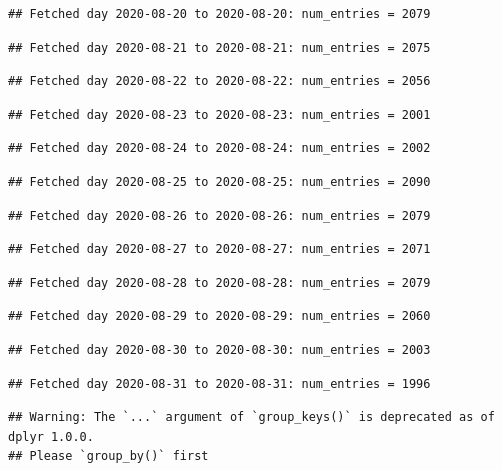 \documentclass[]{article}
\begin{document}
\begin{verbatim}
## Fetched day 2020-08-20 to 2020-08-20: num_entries = 2079
\end{verbatim}

\begin{verbatim}
## Fetched day 2020-08-21 to 2020-08-21: num_entries = 2075
\end{verbatim}

\begin{verbatim}
## Fetched day 2020-08-22 to 2020-08-22: num_entries = 2056
\end{verbatim}

\begin{verbatim}
## Fetched day 2020-08-23 to 2020-08-23: num_entries = 2001
\end{verbatim}

\begin{verbatim}
## Fetched day 2020-08-24 to 2020-08-24: num_entries = 2002
\end{verbatim}

\begin{verbatim}
## Fetched day 2020-08-25 to 2020-08-25: num_entries = 2090
\end{verbatim}

\begin{verbatim}
## Fetched day 2020-08-26 to 2020-08-26: num_entries = 2079
\end{verbatim}

\begin{verbatim}
## Fetched day 2020-08-27 to 2020-08-27: num_entries = 2071
\end{verbatim}

\begin{verbatim}
## Fetched day 2020-08-28 to 2020-08-28: num_entries = 2079
\end{verbatim}

\begin{verbatim}
## Fetched day 2020-08-29 to 2020-08-29: num_entries = 2060
\end{verbatim}

\begin{verbatim}
## Fetched day 2020-08-30 to 2020-08-30: num_entries = 2003
\end{verbatim}

\begin{verbatim}
## Fetched day 2020-08-31 to 2020-08-31: num_entries = 1996
\end{verbatim}

\begin{verbatim}
## Warning: The `...` argument of `group_keys()` is deprecated as of dplyr 1.0.0.
## Please `group_by()` first
\end{verbatim}
\end{document}
